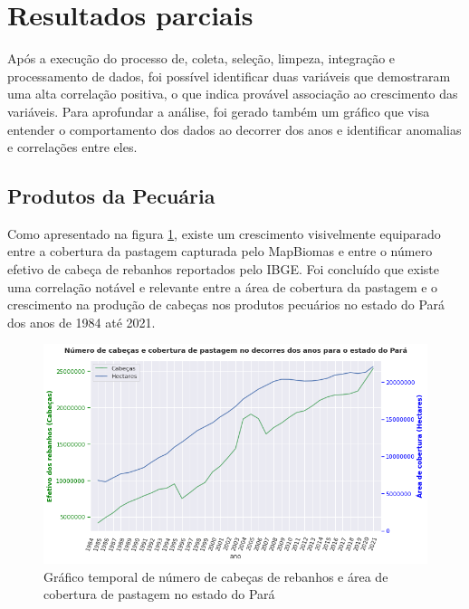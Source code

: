 
\section{Resultados parciais}



Após a execução do processo de, coleta, seleção, limpeza, integração e processamento de dados, foi possível identificar duas variáveis que demostraram uma alta correlação positiva, o que indica provável associação ao crescimento das variáveis. Para aprofundar a análise, foi gerado também um gráfico que visa entender o comportamento dos dados ao decorrer dos anos e identificar anomalias e correlações entre eles.



\subsection{Produtos da Pecuária}

Como apresentado na figura \ref{fig:cobertura_pastagem-numero_cabeca}, existe um crescimento visivelmente equiparado entre a cobertura da pastagem capturada pelo MapBiomas e entre o número efetivo de cabeça de rebanhos reportados pelo IBGE. Foi concluído que existe uma correlação notável e relevante entre a área de cobertura da pastagem e o crescimento na produção de cabeças nos produtos pecuários no estado do Pará dos anos de 1984 até 2021.

\begin{figure}[hbt!]
    \centering
    \includegraphics[width=0.9\columnwidth]{src/plots/plot-cobertura_pastagem-numero_cabecas.png}
    \centering
    \caption{Gráfico temporal de número de cabeças de rebanhos e área de cobertura de pastagem no estado do Pará}
    \label{fig:cobertura_pastagem-numero_cabeca}
\end{figure}

